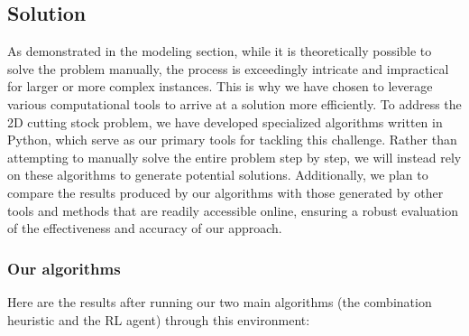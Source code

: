 \documentclass[a4paper]{article}
\begin{document}
    \subsection{Solution}
    As demonstrated in the modeling section, while it is theoretically possible to solve the problem manually, the process is exceedingly intricate and impractical for larger or more complex instances. This is why we have chosen to leverage various computational tools to arrive at a solution more efficiently. To address the 2D cutting stock problem, we have developed specialized algorithms written in Python, which serve as our primary tools for tackling this challenge. Rather than attempting to manually solve the entire problem step by step, we will instead rely on these algorithms to generate potential solutions. Additionally, we plan to compare the results produced by our algorithms with those generated by other tools and methods that are readily accessible online, ensuring a robust evaluation of the effectiveness and accuracy of our approach.

    \subsubsection{Our algorithms}
    Here are the results after running our two main algorithms (the combination heuristic and the RL agent) through this environment:
\end{document}
